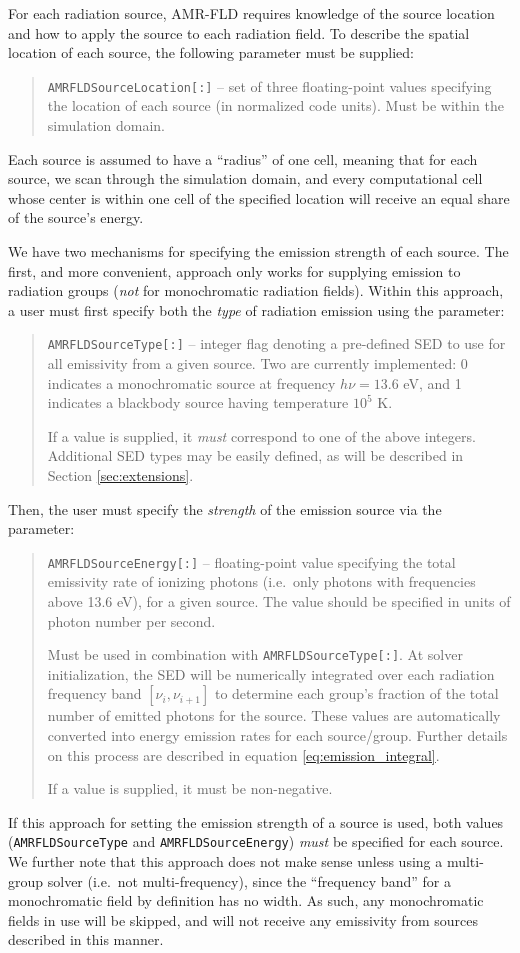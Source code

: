 \documentclass[10pt]{article}
\renewcommand{\(}{\left(}
\renewcommand{\)}{\right)}
\begin{document}
For each radiation source, AMR-FLD requires knowledge of the source
location and how to apply the source to each radiation field.  To
describe the spatial location of each source, the following parameter
must be supplied:
%
\blockquote{{\tt AMRFLDSourceLocation[:]} -- set of three
  floating-point values specifying the location of each source (in
  normalized code units).  Must be within the simulation domain.}
%
Each source is assumed to have a ``radius'' of one cell, meaning that
for each source, we scan through the simulation domain, and every
computational cell whose center is within one cell of the specified
location will receive an equal share of the source's energy.

We have two mechanisms for specifying the emission strength of each
source.  The first, and more convenient, approach only works for
supplying emission to radiation groups ({\em not} for monochromatic
radiation fields).  Within this approach, a user must first specify
both the {\em type} of radiation emission using the parameter:
%
\blockquote{{\tt AMRFLDSourceType[:]} -- integer flag denoting a
  pre-defined SED to use for all emissivity from a given source.  Two
  are currently implemented: 0 indicates a monochromatic source at
  frequency $h\nu=13.6$ eV, and 1 indicates a blackbody source having 
  temperature $10^5$ K. 

  If a value is supplied, it {\em must} correspond to one of the above
  integers.  Additional SED types may be easily defined, as will be
  described in Section \ref{sec:extensions}.}
%
Then, the user must specify the {\em strength} of the emission source
via the parameter:
\blockquote{{\tt AMRFLDSourceEnergy[:]} -- floating-point value
  specifying the total emissivity rate of ionizing photons (i.e.~only
  photons with frequencies above 13.6 eV), for a given source.  The
  value should be specified in units of photon number per second.

  Must be used in combination with {\tt AMRFLDSourceType[:]}.  At
  solver initialization, the SED will be numerically integrated over
  each radiation frequency band $[\nu_i, \nu_{i+1}]$ to determine each
  group's fraction of the total number of emitted photons for the
  source.  These values are automatically converted into energy
  emission rates for each source/group.  Further details on this
  process are described in equation \eqref{eq:emission_integral}.

  If a value is supplied, it must be non-negative.}
%
If this approach for setting the emission strength of a source is
used, both values ({\tt AMRFLDSourceType} and {\tt AMRFLDSourceEnergy}) 
{\em must} be specified for each source.  We further note that this
approach does not make sense unless using a multi-group solver
(i.e.~not multi-frequency), since the ``frequency band'' for a
monochromatic field by definition has no width.  As such, any
monochromatic fields in use will be skipped, and will not receive any
emissivity from sources described in this manner.
\end{document}
